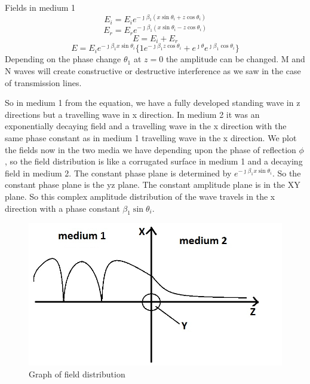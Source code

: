 Fields in medium 1
\begin{equation}
E_i = E_i e^{- \jmath \beta_1(x\sin\theta_i + z\cos\theta_i)}
\end{equation}
\begin{equation}
E_r = E_r e^{- \jmath \beta_1(x\sin\theta_i - z\cos\theta_i)}
\end{equation}
\begin{equation*}
E = E_i + E_r
\end{equation*}
\begin{equation*}
E = E_i e^{- \jmath \beta_1x\sin\theta_i}\{ 1e^{- \jmath \beta_1z\cos\theta_i} + e^{\jmath \theta}
e^{\jmath \beta_1\cos\theta_i} \}
\end{equation*}
Depending on the phase change $\theta_1$ at $z = 0$ the amplitude can be changed. M and N waves will create constructive or destructive interference as we saw in the case of transmission lines. 

So in medium 1 from the equation, we have a fully developed standing wave in z directions but a travelling wave in x direction. In medium 2 it was an exponentially decaying field and a travelling wave in the x direction with the same phase constant as in medium 1 travelling wave in the x direction. We plot the fields now in the two media we have depending upon the phase of reflection $\phi$, so the field distribution is like a corrugated surface in medium 1 and a decaying field in medium 2. The constant phase plane is determined by $e^{- \jmath \beta_1x\sin\theta_i}$. So the constant phase plane is the yz plane. The constant amplitude plane is in the XY plane. So this complex amplitude distribution of the wave travels in the x direction with a phase constant $\beta_1\sin\theta_i$.
\begin{figure}[h]
\centering
\includegraphics[width=.7\linewidth]{./graphics/fig324}
\caption{Graph of field distribution}
\end{figure}

